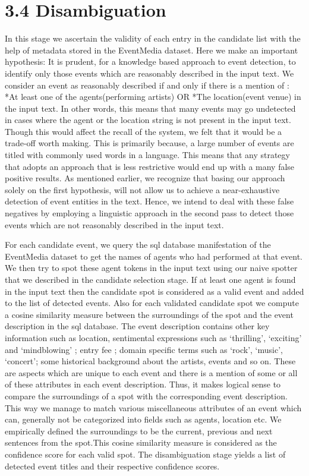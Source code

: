 \documentclass[a4paper,11pt]{report}
\begin{document}

\section*{3.4 Disambiguation}

In this stage we ascertain the validity of each entry in the candidate list with the help of metadata stored in the EventMedia dataset. Here we make an important hypothesis: It is prudent, for a knowledge based approach to event detection, to identify only those events which are reasonably described in the input text. We consider an event as reasonably described if and only if there is a mention of :
*At least one of the agents(performing artists)  OR *The location(event venue) in the input text. In other words, this means that many events may go undetected in cases where the agent or the location string is not present in the input text. Though this would affect the recall of the system, we felt that it would be a trade-off worth making. This is primarily because, a large number of events are titled with commonly used words in a language. This means that any strategy that adopts an approach that is less restrictive would end up with a many false positive results. As mentioned earlier, we recognize that basing our approach solely on the first hypothesis, will not allow us to achieve a near-exhaustive detection of event entities in the text. Hence, we intend to deal with these false negatives by employing a linguistic approach in the second pass to detect those events which are not reasonably described in the input text.

For each candidate event, we query the sql database manifestation of the EventMedia dataset to get the names of agents who had performed at that event. We then try to spot these  agent tokens in the input text using our naive spotter that we described in the candidate selection stage. If at least one agent is found in the input text then the candidate spot is considered as a valid event and added to the list of detected events. Also for each validated candidate spot we compute a cosine similarity measure between the surroundings of the spot and the event description in the sql database. The event description contains other key information such as location, sentimental expressions such as `thrilling', `exciting' and `mindblowing' ; entry fee ; domain specific terms such as `rock', `music', `concert'; some historical background about the artists, events and so on. These are aspects which are unique to each event and there is a mention of some or all of these attributes in each event description. Thus, it makes logical sense to compare the surroundings of a spot with the corresponding event description. This way we manage to match various miscellaneous attributes of an event which can, generally not be categorized into fields such as agents, location etc. We empirically defined the surroundings to be the current, previous and next sentences from the spot.This cosine similarity measure is considered as the confidence score for each valid spot. The disambiguation stage yields a list of detected event titles and their respective confidence scores.
\end{document}
